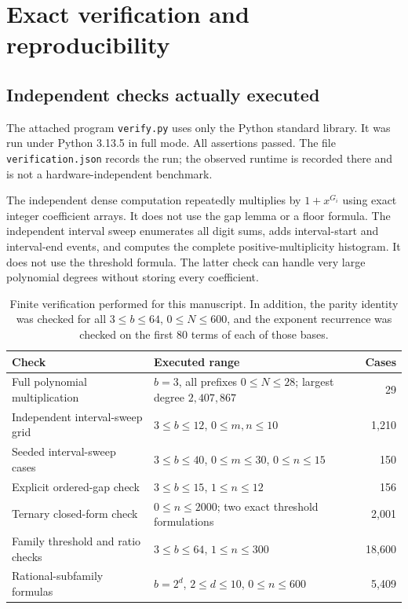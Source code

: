 \documentclass[11pt,letterpaper]{article}
\numberwithin{equation}{section}
\theoremstyle{definition}
\theoremstyle{remark}
\begin{document}
\section{Exact verification and reproducibility}\label{sec:verification}

\subsection{Independent checks actually executed}
The attached program \texttt{verify.py} uses only the Python standard library. It was run under Python 3.13.5 in full mode. All assertions passed. The file \texttt{verification.json} records the run; the observed runtime is recorded there and is not a hardware-independent benchmark.

The independent dense computation repeatedly multiplies by $1+x^{G_i}$ using exact integer coefficient arrays. It does not use the gap lemma or a floor formula. The independent interval sweep enumerates all digit sums, adds interval-start and interval-end events, and computes the complete positive-multiplicity histogram. It does not use the threshold formula. The latter check can handle very large polynomial degrees without storing every coefficient.

\begin{table}[htbp]
\centering\small
\begin{tabularx}{\textwidth}{@{}p{}Xr@{}}
\toprule
Check & Executed range & Cases\\
\midrule
Full polynomial multiplication & $b=3$, all prefixes $0\le N\le28$; largest degree $2{,}407{,}867$ &29\\
Independent interval-sweep grid & $3\le b\le12$, $0\le m,n\le10$ &1,210\\
Seeded interval-sweep cases & $3\le b\le40$, $0\le m\le30$, $0\le n\le15$ &150\\
Explicit ordered-gap check & $3\le b\le15$, $1\le n\le12$ &156\\
Ternary closed-form check & $0\le n\le2000$; two exact threshold formulations &2,001\\
Family threshold and ratio checks & $3\le b\le64$, $1\le n\le300$ &18,600\\
Rational-subfamily formulas & $b=2^d$, $2\le d\le10$, $0\le n\le600$ &5,409\\
\bottomrule
\end{tabularx}
\caption{Finite verification performed for this manuscript. In addition, the parity identity was checked for all $3\le b\le64$, $0\le N\le600$, and the exponent recurrence was checked on the first 80 terms of each of those bases.}
\label{tab:verification}
\end{table}
\end{document}
